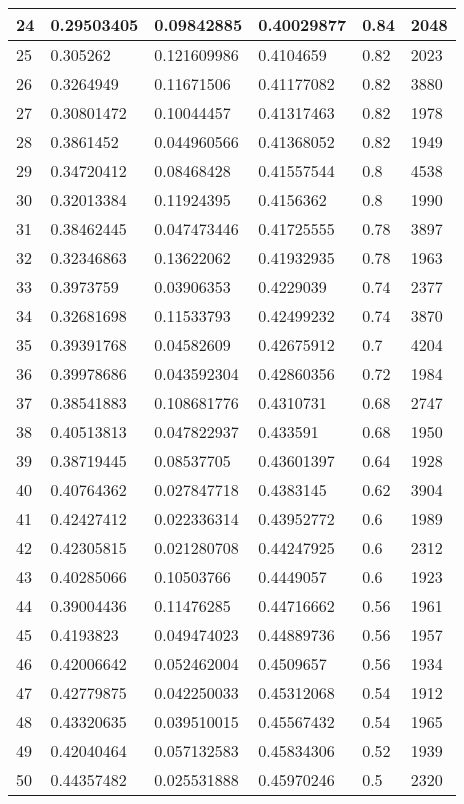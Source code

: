\begin{longtable}{|l|l|l|l|l|l|}
24 & 0.29503405 & 0.09842885 & 0.40029877 & 0.84 & 2048 \\ \hline 
25 & 0.305262 & 0.121609986 & 0.4104659 & 0.82 & 2023 \\ \hline 
26 & 0.3264949 & 0.11671506 & 0.41177082 & 0.82 & 3880 \\ \hline 
27 & 0.30801472 & 0.10044457 & 0.41317463 & 0.82 & 1978 \\ \hline 
28 & 0.3861452 & 0.044960566 & 0.41368052 & 0.82 & 1949 \\ \hline 
29 & 0.34720412 & 0.08468428 & 0.41557544 & 0.8 & 4538 \\ \hline 
30 & 0.32013384 & 0.11924395 & 0.4156362 & 0.8 & 1990 \\ \hline 
31 & 0.38462445 & 0.047473446 & 0.41725555 & 0.78 & 3897 \\ \hline 
32 & 0.32346863 & 0.13622062 & 0.41932935 & 0.78 & 1963 \\ \hline 
33 & 0.3973759 & 0.03906353 & 0.4229039 & 0.74 & 2377 \\ \hline 
34 & 0.32681698 & 0.11533793 & 0.42499232 & 0.74 & 3870 \\ \hline 
35 & 0.39391768 & 0.04582609 & 0.42675912 & 0.7 & 4204 \\ \hline 
36 & 0.39978686 & 0.043592304 & 0.42860356 & 0.72 & 1984 \\ \hline 
37 & 0.38541883 & 0.108681776 & 0.4310731 & 0.68 & 2747 \\ \hline 
38 & 0.40513813 & 0.047822937 & 0.433591 & 0.68 & 1950 \\ \hline 
39 & 0.38719445 & 0.08537705 & 0.43601397 & 0.64 & 1928 \\ \hline 
40 & 0.40764362 & 0.027847718 & 0.4383145 & 0.62 & 3904 \\ \hline 
41 & 0.42427412 & 0.022336314 & 0.43952772 & 0.6 & 1989 \\ \hline 
42 & 0.42305815 & 0.021280708 & 0.44247925 & 0.6 & 2312 \\ \hline 
43 & 0.40285066 & 0.10503766 & 0.4449057 & 0.6 & 1923 \\ \hline 
44 & 0.39004436 & 0.11476285 & 0.44716662 & 0.56 & 1961 \\ \hline 
45 & 0.4193823 & 0.049474023 & 0.44889736 & 0.56 & 1957 \\ \hline 
46 & 0.42006642 & 0.052462004 & 0.4509657 & 0.56 & 1934 \\ \hline 
47 & 0.42779875 & 0.042250033 & 0.45312068 & 0.54 & 1912 \\ \hline 
48 & 0.43320635 & 0.039510015 & 0.45567432 & 0.54 & 1965 \\ \hline 
49 & 0.42040464 & 0.057132583 & 0.45834306 & 0.52 & 1939 \\ \hline 
50 & 0.44357482 & 0.025531888 & 0.45970246 & 0.5 & 2320 \\ \hline 
\end{longtable}